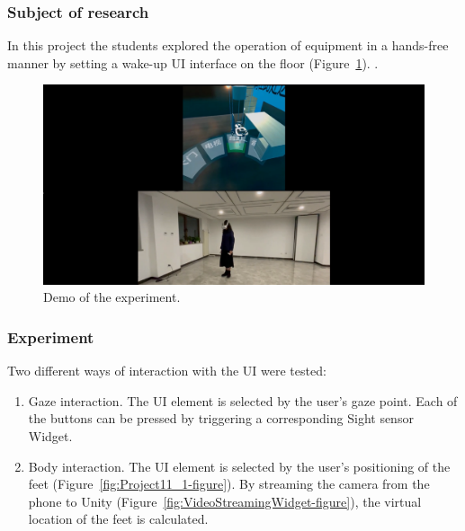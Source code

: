 \subsubsection{Subject of research}

In this project the students explored the operation of equipment in a hands-free manner by setting a wake-up UI interface on the floor (Figure~\ref{fig:Project11-figure}). .

\begin{figure}
  \centering
  \includegraphics[width=0.9\linewidth]{figures/Project_11.png}
  \caption{Demo of the experiment.}
  \label{fig:Project11-figure}
\end{figure}

\subsubsection{Experiment}

Two different ways of interaction with the UI were tested:
\begin{enumerate}
    \item Gaze interaction. The UI element is selected by the user's gaze point. Each of the buttons can be pressed by triggering a corresponding Sight sensor Widget.
    \item Body interaction. The UI element is selected by the user's positioning of the feet (Figure~\ref{fig:Project11_1-figure}). By streaming the camera from the phone to Unity (Figure~\ref{fig:VideoStreamingWidget-figure}), the virtual location of the feet is calculated.
\end{enumerate}


